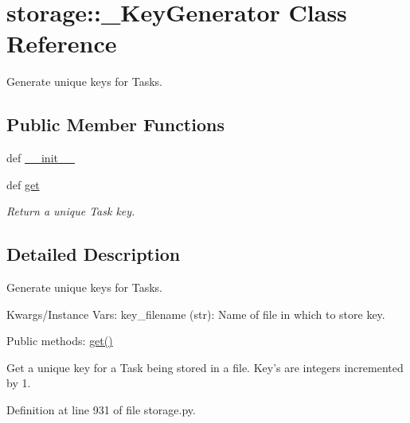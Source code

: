 \hypertarget{classstorage_1_1__KeyGenerator}{
\section{storage\-:\-:\-\_\-\-Key\-Generator \-Class \-Reference}
\label{classstorage_1_1__KeyGenerator}
}


\-Generate unique keys for \-Tasks.  


\subsection*{\-Public \-Member \-Functions}
\begin{DoxyCompactItemize}
\item 
def \hyperlink{classstorage_1_1__KeyGenerator_a30be863b3750c5c64f70cf5248077d00}{\-\_\-\-\_\-init\-\_\-\-\_\-}
\item 
def \hyperlink{classstorage_1_1__KeyGenerator_a8af8da73137b1d6baf04cbf007b61eda}{get}
\begin{DoxyCompactList}\small\item\em \-Return a unique \-Task key. \end{DoxyCompactList}\end{DoxyCompactItemize}


\subsection{\-Detailed \-Description}
\-Generate unique keys for \-Tasks. 

\-Kwargs/\-Instance \-Vars\-: key\-\_\-filename (str)\-: \-Name of file in which to store key.

\-Public methods\-: \hyperlink{classstorage_1_1__KeyGenerator_a8af8da73137b1d6baf04cbf007b61eda}{get()}

\-Get a unique key for a \-Task being stored in a file. \-Key's are integers incremented by 1. 

\-Definition at line 931 of file storage.\-py.



